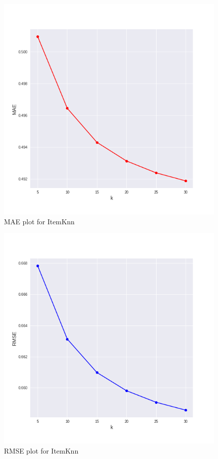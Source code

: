 \documentclass[letterpaper, 10 pt, conference]{ieeeconf}  %
\begin{document}
\begin{figure}[h]
            \includegraphics[scale=0.4]{MAE_itemKnn.png}
            \centering
            \caption{MAE plot for ItemKnn}
            \label{fig:MAE_ItemKnn}
        \end{figure}
 \begin{figure}[h]
            \includegraphics[scale=0.4]{RMSE_itemKnn.png}
            \centering
            \caption{RMSE plot for ItemKnn}
            \label{fig:RMSE_ItemKnn}
        \end{figure}       
\end{document}

